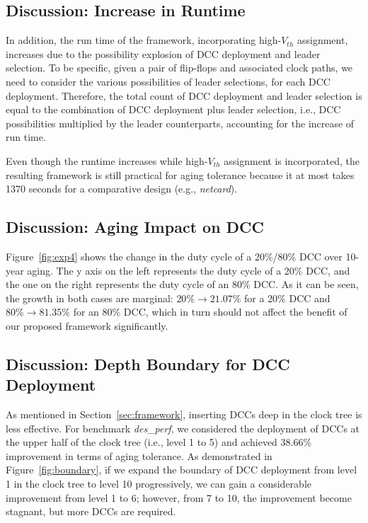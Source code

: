 \subsection{Discussion: Increase in Runtime}
In addition, the run time of the framework, incorporating high-$V_{th}$ assignment, increases due to the possibility explosion of DCC deployment and leader selection. To be specific, given a pair of flip-flops and associated clock paths, we need to consider the various possibilities of leader selections, for each DCC deployment. Therefore, the total  count of DCC deployment and leader selection is equal to the combination of DCC deployment plus leader selection, i.e., DCC possibilities multiplied by the leader counterparts, accounting for the increase of run time. 

Even though the runtime increases while high-$V_{th}$ assignment is incorporated, the resulting framework is still practical for aging tolerance because it at most takes 1370 seconds for a comparative design (e.g., \textit{netcard}).
\subsection{Discussion: Aging Impact on DCC}


Figure~\ref{fig:exp4} shows the change in the duty cycle of a 20\%/80\% DCC over 10-year aging. The y axis on the left represents the duty cycle of a 20\% DCC, and the one on the right represents the duty cycle of an 80\% DCC. As it can be seen, the growth in both cases are marginal: $20\% \to 21.07\%$ for a 20\% DCC and $80\% \to 81.35\%$ for an 80\% DCC, which in turn should not affect the benefit of our proposed framework significantly.


\subsection{Discussion: Depth Boundary for DCC Deployment}

As mentioned in Section~\ref{sec:framework}, inserting DCCs deep in the clock tree is less effective. For benchmark \textit{des\_perf}, we considered the deployment of DCCs at the upper half of the clock tree (i.e., level 1 to 5) and achieved 38.66\% improvement in terms of aging tolerance. As demonstrated in Figure~\ref{fig:boundary}, if we expand the boundary of DCC deployment from level 1 in the clock tree to level 10 progressively, we can gain a considerable improvement from level 1 to 6; however, from 7 to 10, the improvement become stagnant, but more DCCs are required.


